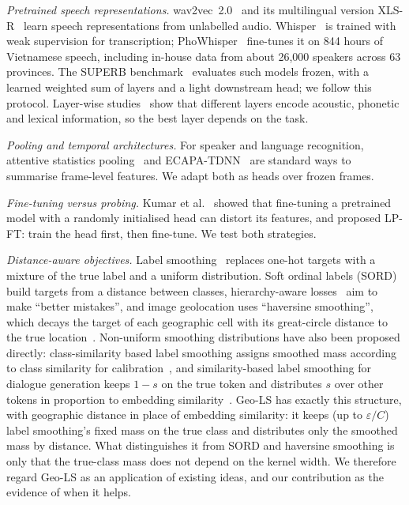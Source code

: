 \documentclass[conference]{IEEEtran}
\begin{document}
\textit{Pretrained speech representations.} wav2vec~2.0~\cite{wav2vec2} and its multilingual version XLS-R~\cite{xlsr} learn speech representations from unlabelled audio. Whisper~\cite{whisper} is trained with weak supervision for transcription; PhoWhisper~\cite{phowhisper} fine-tunes it on 844 hours of Vietnamese speech, including in-house data from about 26,000 speakers across 63 provinces. The SUPERB benchmark~\cite{superb} evaluates such models frozen, with a learned weighted sum of layers and a light downstream head; we follow this protocol. Layer-wise studies~\cite{pasad} show that different layers encode acoustic, phonetic and lexical information, so the best layer depends on the task.

\textit{Pooling and temporal architectures.} For speaker and language recognition, attentive statistics pooling~\cite{asp} and ECAPA-TDNN~\cite{ecapa} are standard ways to summarise frame-level features. We adapt both as heads over frozen frames.

\textit{Fine-tuning versus probing.} Kumar et al.~\cite{lpft} showed that fine-tuning a pretrained model with a randomly initialised head can distort its features, and proposed LP-FT: train the head first, then fine-tune. We test both strategies.

\textit{Distance-aware objectives.} Label smoothing~\cite{inception,muller} replaces one-hot targets with a mixture of the true label and a uniform distribution. Soft ordinal labels (SORD)~\cite{sord} build targets from a distance between classes, hierarchy-aware losses~\cite{bettermistakes} aim to make ``better mistakes'', and image geolocation uses ``haversine smoothing'', which decays the target of each geographic cell with its great-circle distance to the true location~\cite{pigeon}. Non-uniform smoothing distributions have also been proposed directly: class-similarity based label smoothing assigns smoothed mass according to class similarity for calibration~\cite{liujaja}, and similarity-based label smoothing for dialogue generation keeps $1-s$ on the true token and distributes $s$ over other tokens in proportion to embedding similarity~\cite{saha}. Geo-LS has exactly this structure, with geographic distance in place of embedding similarity: it keeps (up to $\varepsilon/C$) label smoothing's fixed mass on the true class and distributes only the smoothed mass by distance. What distinguishes it from SORD and haversine smoothing is only that the true-class mass does not depend on the kernel width. We therefore regard Geo-LS as an application of existing ideas, and our contribution as the evidence of when it helps.
\end{document}
